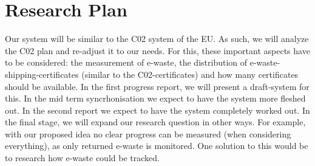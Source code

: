 \documentclass[sigchi-a, authorversion]{acmart}
\begin{document}
\section{Research Plan}

Our system will be similar to the C02 system of the EU. As such, we will analyze the C02 plan and re-adjust 
it to our needs. For this, these important aspects have to be considered: the measurement of e-waste, 
the distribution of e-waste-shipping-certificates (similar to the C02-certificates) and how many certificates 
should be available. 
In the first progress report, we will present a draft-system for this. In the mid term syncrhonisation we expect
to have the system more fleshed out. In the second report we expect to have the system completely worked out.
In the final stage, we will expand our research question in other ways. For example, with our proposed idea no clear
progress can be measured (when considering everything), as only returned e-waste is monitored. One solution to this would
be to research how e-waste could be tracked. 



\end{document}
